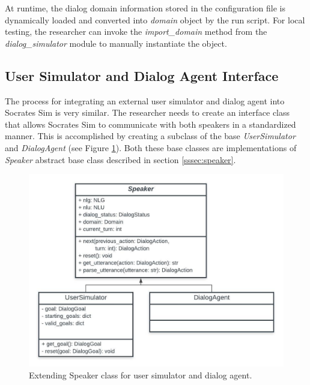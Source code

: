 At runtime, the dialog domain information stored in the configuration file is dynamically loaded and converted into \textit{domain} object by the run script. For local testing, the researcher can invoke the \textit{import\_domain} method from the \textit{dialog\_simulator} module to manually instantiate the object. 

\subsection{User Simulator and Dialog Agent  Interface}
\label{sec:speake_interface}
The process for integrating an external user simulator and dialog agent into Socrates Sim is very similar. The researcher needs to create an interface class that allows Socrates Sim to communicate with both speakers in a standardized manner.  This is accomplished by creating a subclass of the base \textit{UserSimulator} and \textit{DialogAgent} (see Figure \ref{fig:speaker_ext}). Both these base classes are implementations of \textit{Speaker} abstract base class described in section \ref{sssec:speaker}. 

\begin{figure}[h!]
	\centering
	\includegraphics[scale=.75]{diagrams/speaker_classes.jpeg}
	\caption{ Extending Speaker class for user simulator and dialog agent.} 
	\label{fig:speaker_ext}
\end{figure}

